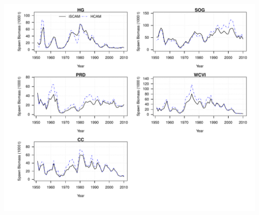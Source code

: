 \begin{frame}[c]
{	\includegraphics[clip,trim=9.775cm 5.7cm 0cm 5.1cm]
	{../FIGS/iscam_fig_SBt_iSCAMvsHCAM}
	}
\end{frame}

